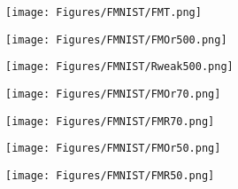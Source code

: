 \begin{figure*}[htbp]
    \centering
    \begin{minipage}{0.28\textwidth}
        \centering
        \texttt{[image: Figures/FMNIST/FMT.png]}
    \end{minipage}
    
    \vspace{0.1em} %
    \begin{minipage}{0.28\textwidth}
        \centering
        \texttt{[image: Figures/FMNIST/FMOr500.png]}
    \end{minipage}
    \hspace{13em} 
    \begin{minipage}{0.28\textwidth}
        \centering
        \texttt{[image: Figures/FMNIST/Rweak500.png]}
    \end{minipage}

    \vspace{0.1em} 
    
    \begin{minipage}{0.28\textwidth}
        \centering
        \texttt{[image: Figures/FMNIST/FMOr70.png]}
    \end{minipage}
    \hspace{13em} %
     \begin{minipage}{0.28\textwidth}
        \centering
        \texttt{[image: Figures/FMNIST/FMR70.png]}
    \end{minipage}
    
\vspace{0.1em}

    \begin{minipage}{0.28\textwidth}
        \centering
        \texttt{[image: Figures/FMNIST/FMOr50.png]}
    \end{minipage}
     \hspace{13em} %
    \begin{minipage}{0.28\textwidth}
        \centering
        \texttt{[image: Figures/FMNIST/FMR50.png]}
    \end{minipage}
    

\end{figure*}
